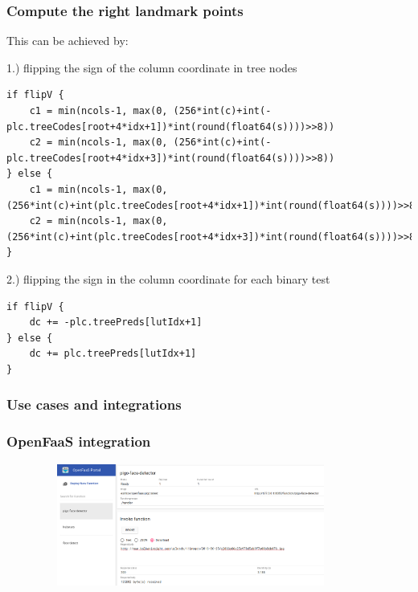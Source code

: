 \documentclass[9pt]{beamer}
\begin{document}
\begin{frame}[fragile]
\frametitle{Compute the right landmark points}


This can be achieved by:


1.) flipping the sign of the column coordinate in tree nodes



\begin{verbatim}
if flipV {
    c1 = min(ncols-1, max(0, (256*int(c)+int(-plc.treeCodes[root+4*idx+1])*int(round(float64(s))))>>8))
    c2 = min(ncols-1, max(0, (256*int(c)+int(-plc.treeCodes[root+4*idx+3])*int(round(float64(s))))>>8))
} else {
    c1 = min(ncols-1, max(0, (256*int(c)+int(plc.treeCodes[root+4*idx+1])*int(round(float64(s))))>>8))
    c2 = min(ncols-1, max(0, (256*int(c)+int(plc.treeCodes[root+4*idx+3])*int(round(float64(s))))>>8))
}

\end{verbatim}


2.) flipping the sign in the column coordinate for each binary test



\begin{verbatim}
if flipV {
    dc += -plc.treePreds[lutIdx+1]
} else {
    dc += plc.treePreds[lutIdx+1]
}

\end{verbatim}



\end{frame}

\begin{frame}[fragile]
\frametitle{Use cases and integrations}


\end{frame}

\begin{frame}[fragile]
\frametitle{OpenFaaS integration}


\begin{figure}[h]
\begin{center}
\includegraphics[width=10cm,height=4cm]{assets/pigo_openfaas.png}
\end{center}

\end{figure}


\end{frame}
\end{document}

